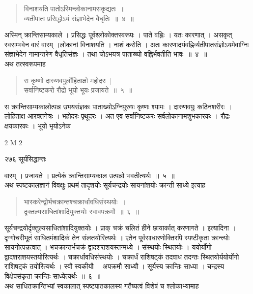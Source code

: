 \documentclass[11pt, openany]{book}
\begin{document}
\begin{quote}
{\ssi विनाशयति पातोऽस्मिन्लोकानामसकृद्यतः~।\\
व्यतीपातः प्रसिद्धोऽयं संज्ञाभेदेन वैधृतिः~॥~४~॥}
\end{quote}
अस्मिन् क्रान्तिसाम्यकाले । प्रसिद्धः पूर्वश्लोकोक्तस्वरूपः । पाते वह्निः । यतः कारणात् । असकृत् स्वसम्भवेन वारं वारम् ।लोकानां विनाशयति । नाशं करोति । अतः कारणादयंवह्निर्व्यतीपातसंज्ञोऽयमेवाग्निः संज्ञाभेदेन नामान्तरेण वैधृतिसंज्ञः । तथा चोऽभयत्र पाताख्यो वह्निर्भवतीति भावः~॥~४~॥\\
\noindent अथ तत्स्वरूपमाह \textendash

 \begin{quote}
{\ssi  स कृष्णो दारुणवपुर्लोहिताक्षो महोदरः~|\\ 
सर्वानिष्टकरो रौद्रो भूयो भूयः प्रजायते~॥~५~॥ }
\end{quote}
 स क्रान्तिसाम्यकालोत्पन्न उभयसंज्ञकः पाताख्योऽग्निपुरुषः कृष्णः श्यामः । दारुणवपुः कठिनशरीरः । लोहिताक्ष आरक्तनेत्रः । भहोदरः पृथूदरः । अत एव सर्वानिष्टकरः सर्वलोकानामशुभकारकः । रौद्रः क्षयकारकः । भूयो भृयोऽनेक \textendash


{\tiny{2 M 2 }}

\newpage

\noindent २७६ \hspace{4cm} सूर्यसिद्धान्तः
\vspace{1cm}


\noindent वारम् । प्रजायते । प्रत्येकं क्रान्तिसाम्यकाल उत्पन्नो भवतीत्यर्थः~॥~५~॥\\
\noindent अथ स्पष्टकालज्ञानं विवक्षुः प्रथमं तादृशयोः सूर्यचन्द्रयोः सायनांशयोः क्रान्ती साध्ये इत्याह \textendash

 \begin{quote}
{\ssi भास्करेन्द्वोर्भचक्रान्तश्चक्रार्धावधिसंस्थयोः~।\\
 दृक्तल्यसाधितांशादियुक्तयोः स्वावपक्रमौ~॥~६~॥ }
\end{quote}
सूर्यचन्द्रयोर्दृक्तुल्यसाधितांशादियुक्तयोः । प्राक् चक्रं चलितं हीने छायार्कात् करणागते । इत्यादिना । दृग्गोचरीभूतं साधितमंशादिकं तेन संलतयोरित्यर्थः । एतेन पूर्वसाधारणोक्तिरपि स्पष्टीकृता क्रान्त्योः सायनोत्पन्नत्वात् । भचक्रान्तर्भचक्रं द्वादशराशयस्तन्मध्ये । संस्थयोः स्थितयोः । ययोर्योगो द्वादशराशयस्तयोरित्यर्थः । चक्रार्धावधिसंस्थयोः । चक्रार्धं राशिषट्कं तदवाध तदन्तः स्थितयोर्ययोर्योगो राशिषट्कं तयोरित्यर्थः । स्वौ स्वकीयौ । अपक्रमौ साध्यौ । सूर्यस्य क्रान्तिः साध्या । चन्द्रस्य विक्षेपसंकृता क्रान्तिः साध्येत्यर्थः~॥~६~॥\\
\noindent अथ साधितक्रान्तिभ्यां स्वकालात् स्पष्टपातकालस्य गतैष्यत्वं विशेषं च श्लोकाभ्यामाह \textendash
\end{document}
